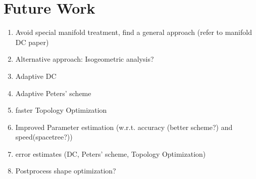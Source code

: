 \section{Future Work}
\label{sec:Future}
\begin{enumerate}
\item Avoid special manifold treatment, find a general approach (refer to manifold DC paper)
\item Alternative approach: Isogeometric analysis?
\item Adaptive DC
\item Adaptive Peters' scheme
\item faster Topology Optimization
\item Improved Parameter estimation (w.r.t. accuracy (better scheme?) and speed(spacetree?))
\item error estimates (DC, Peters' scheme, Topology Optimization)
\item Postprocess shape optimization?
\end{enumerate}